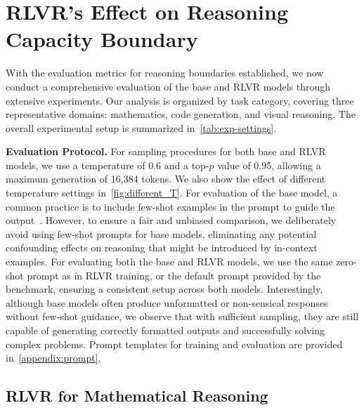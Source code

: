\section{RLVR's Effect on Reasoning Capacity Boundary}
\label{sec:exp}

With the evaluation metrics for reasoning boundaries established, we now conduct a comprehensive evaluation of the base and RLVR models through extensive experiments.  
Our analysis is organized by task category, covering three representative domains: mathematics, code generation, and visual reasoning.
The overall experimental setup is summarized in~\cref{tab:exp-settings}.


\textbf{Evaluation Protocol.}
For sampling procedures for both base and RLVR models, we use a temperature of 0.6 and a top-$p$ value of 0.95, allowing a maximum generation of 16,384 tokens.
We also show the effect of different temperature settings in~\cref{fig:different_T}.
For evaluation of the base model, a common practice is to include few-shot examples in the prompt to guide the output~\cite{grattafiori2024llama3,yang2024qwen25,liu2024deepseekv3}.
However, to ensure a fair and unbiased comparison, we deliberately avoid using few-shot prompts for base models, eliminating any potential confounding effects on reasoning that might be introduced by in-context examples.
For evaluating both the base and RLVR models, we use the same zero-shot prompt as in RLVR training, or the default prompt provided by the benchmark, ensuring a consistent setup across both models.
Interestingly, although base models often produce unformatted or non-sensical responses without few-shot guidance, we observe that with sufficient sampling, they are still capable of generating correctly formatted outputs and successfully solving complex problems.
Prompt templates for training and evaluation are provided in~\cref{appendix:prompt}.


\subsection{RLVR for Mathematical Reasoning}
\label{sec:math}

